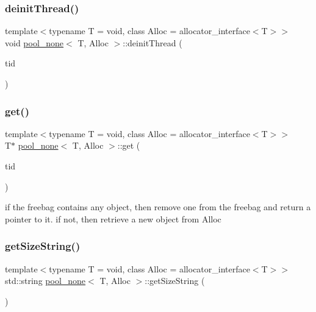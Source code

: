 \mbox{\label{classpool__none_a28f9e8b16ba70d4ed1a9c295bdbc785d}} 
\subsubsection{\texorpdfstring{deinit\+Thread()}{deinitThread()}}
{\footnotesize\ttfamily template$<$typename T  = void, class Alloc  = allocator\+\_\+interface$<$\+T$>$$>$ \\
void \hyperlink{classpool__none}{pool\+\_\+none}$<$ T, Alloc $>$\+::deinit\+Thread (\begin{DoxyParamCaption}\item[{const int}]{tid }\end{DoxyParamCaption})\hspace{0.3cm}{\ttfamily [inline]}}

\mbox{\label{classpool__none_a5cfa4676cbf37a0224224256ab365840}} 
\subsubsection{\texorpdfstring{get()}{get()}}
{\footnotesize\ttfamily template$<$typename T  = void, class Alloc  = allocator\+\_\+interface$<$\+T$>$$>$ \\
T$\ast$ \hyperlink{classpool__none}{pool\+\_\+none}$<$ T, Alloc $>$\+::get (\begin{DoxyParamCaption}\item[{const int}]{tid }\end{DoxyParamCaption})\hspace{0.3cm}{\ttfamily [inline]}}

if the freebag contains any object, then remove one from the freebag and return a pointer to it. if not, then retrieve a new object from Alloc \mbox{\label{classpool__none_abe3bc246d2d7a2c7e118f3da40a14501}} 
\subsubsection{\texorpdfstring{get\+Size\+String()}{getSizeString()}}
{\footnotesize\ttfamily template$<$typename T  = void, class Alloc  = allocator\+\_\+interface$<$\+T$>$$>$ \\
std\+::string \hyperlink{classpool__none}{pool\+\_\+none}$<$ T, Alloc $>$\+::get\+Size\+String (\begin{DoxyParamCaption}{ }\end{DoxyParamCaption})\hspace{0.3cm}{\ttfamily [inline]}}

